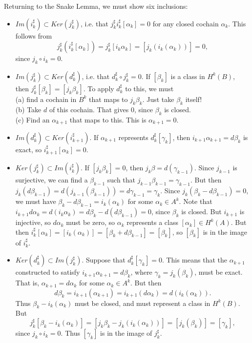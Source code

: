 \documentclass[12pt]{amsbook}
\theoremstyle{definition}
\begin{document}
Returning to the Snake Lemma, we must show six inclusions:
\begin{itemize}

\item $Im(i_k^\sharp)\subset Ker(j_k^\sharp)$, i.e. that 
$j_k^\sharp i_k^\sharp[\alpha_k] = 0$ for any closed cochain $\alpha_k$.
This follows from 
$$j_k^\sharp(i_k^\sharp[\alpha_k]) = j_k^\sharp[i_k \alpha_k]=
[j_k(i_k(\alpha_k))]=0,$$
since $j_k \circ i_k=0$. 

\item $Im(j_k^\sharp) \subset Ker(d_k^\sharp)$, i.e. that 
$d_k^\sharp \circ j_k^\sharp=0$. If $[\beta_k]$ is a class in $H^k(B)$, 
then $j_k^\sharp[\beta_k]=[j_k\beta_k]$. To apply $d_k^\sharp$ to this, we must\\
(a) find a cochain in $B^k$ that maps to $j_k\beta_k$. Just take $\beta_k$ itself! \\ 
(b) Take $d$ of this cochain. That gives 0, since $\beta_k$ is closed. \\
(c) Find an $\alpha_{k+1}$ that maps to this. This is $\alpha_{k+1}=0$. 

\item $Im(d_{k}^\sharp)\subset Ker(i_{k+1}^\sharp)$. 
If $\alpha_{k+1}$ represents $d_k^\sharp[\gamma_k]$, then $i_{k+1}\alpha_{k+1}
= d\beta_k$ is exact, so $i_{k+1}^\sharp[\alpha_k]=0$. 

\item $Ker(j_k^\sharp) \subset Im(i_k^\sharp)$. If $[j_k \beta_k]=0$, then
$j_k \beta = d(\gamma_{k-1})$. Since $j_{k-1}$ is surjective, we can find
a $\beta_{k-1}$ such that $j_{k-1}\beta_{k-1}= \gamma_{k-1}$. But then 
$j_k(d\beta_{k-1})=d(j_{k-1}(\beta_{k-1}))=d\gamma_{k-1}=\gamma_k$. Since 
$j_k(\beta_k-d\beta_{k-1})=0$, we must have $\beta_k-d\beta_{k-1} = 
i_k(\alpha_k)$ for some $\alpha_k \in A^k$. Note that $i_{k+1}d\alpha_k =
d(i_k \alpha_k)=d\beta_k - d(d\beta_{k-1}) = 0$, since $\beta_k$ is closed. 
But $i_{k+1}$ is injective, so $d\alpha_k$ must be zero, so $\alpha_k$
represents a class $[\alpha_k] \in H^k(A)$. But then 
$i_k^\sharp[\alpha_k] = [i_k(\alpha_k)] = [\beta_k + d\beta_{k-1}]=[\beta_k]$,
so $[\beta_k]$ is in the image of $i_k^\sharp$. 

\item $Ker(d_k^\sharp) \subset Im(j_k^\sharp)$. Suppose that 
$d_k^\sharp[\gamma_k]=0$. This means that the $\alpha_{k+1}$ constructed to 
satisfy $i_{k+1}\alpha_{k+1} = d\beta_k$, where $\gamma_k=j_k(\beta_k)$, must 
be exact. That is, $\alpha_{k+1}=d\alpha_k$ for some $\alpha_k \in A^k$.
But then
$$ d\beta_k = i_{k+1}(\alpha_{k+1}) = i_{k+1}(d\alpha_k)=d(i_k(\alpha_k)).$$
Thus $\beta_k - i_k(\alpha_k)$ must be closed, and must represent a 
class in $H^k(B)$. But 
$$j_k^\sharp[\beta_k-i_k(\alpha_k)] = [j_k\beta_k - j_k(i_k(\alpha_k))]
= [j_k(\beta_k)] = [\gamma_k],$$
since $j_k\circ i_k = 0$. Thus $[\gamma_k]$ is in the image of $j_k^\sharp$.


\end{itemize}
\end{document}
